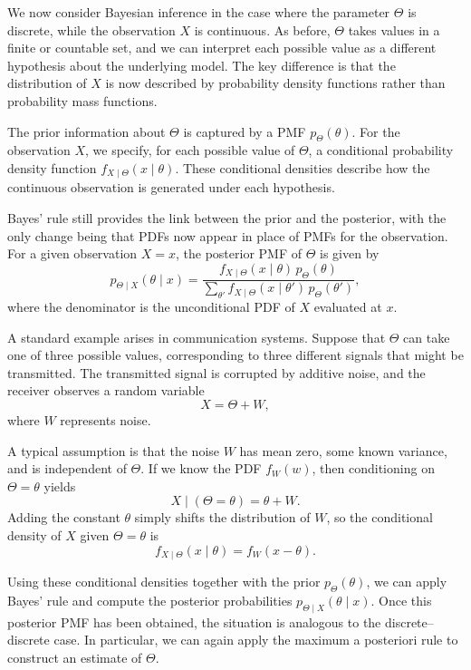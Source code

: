 We now consider Bayesian inference in the case where the parameter \(\Theta\) is discrete, while the observation \(X\) is continuous.  
As before, \(\Theta\) takes values in a finite or countable set, and we can interpret each possible value as a different hypothesis about the underlying model.  
The key difference is that the distribution of \(X\) is now described by probability density functions rather than probability mass functions.  

The prior information about \(\Theta\) is captured by a PMF \(p_{\Theta}(\theta)\).  
For the observation \(X\), we specify, for each possible value of \(\Theta\), a conditional probability density function \(f_{X \mid \Theta}(x \mid \theta)\).  
These conditional densities describe how the continuous observation is generated under each hypothesis.  

Bayes' rule still provides the link between the prior and the posterior, with the only change being that PDFs now appear in place of PMFs for the observation.  
For a given observation \(X = x\), the posterior PMF of \(\Theta\) is given by
\[
p_{\Theta \mid X}(\theta \mid x)
=
\frac{f_{X \mid \Theta}(x \mid \theta)\,p_{\Theta}(\theta)}
{\sum_{\theta'} f_{X \mid \Theta}(x \mid \theta')\,p_{\Theta}(\theta')},
\]
where the denominator is the unconditional PDF of \(X\) evaluated at \(x\).  

A standard example arises in communication systems.  
Suppose that \(\Theta\) can take one of three possible values, corresponding to three different signals that might be transmitted.  
The transmitted signal is corrupted by additive noise, and the receiver observes a random variable
\[
X = \Theta + W,
\]
where \(W\) represents noise.  

A typical assumption is that the noise \(W\) has mean zero, some known variance, and is independent of \(\Theta\).  
If we know the PDF \(f_{W}(w)\), then conditioning on \(\Theta = \theta\) yields
\[
X \mid (\Theta = \theta) = \theta + W.
\]
Adding the constant \(\theta\) simply shifts the distribution of \(W\), so the conditional density of \(X\) given \(\Theta = \theta\) is
\[
f_{X \mid \Theta}(x \mid \theta)
=
f_{W}(x - \theta).
\]

Using these conditional densities together with the prior \(p_{\Theta}(\theta)\), we can apply Bayes' rule and compute the posterior probabilities \(p_{\Theta \mid X}(\theta \mid x)\).  
Once this posterior PMF has been obtained, the situation is analogous to the discrete–discrete case.  
In particular, we can again apply the maximum a posteriori rule to construct an estimate of \(\Theta\).  

